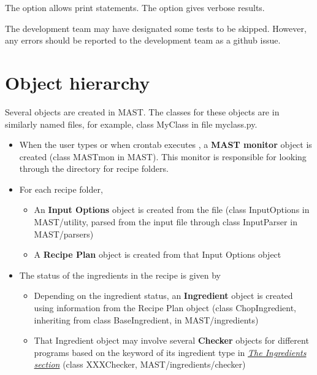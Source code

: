 \documentclass[letterpaper,10pt,english]{sphinxmanual}
\begin{document}
The  option allows print statements.
The  option gives verbose results.

The development team may have designated some tests to be skipped. However, any errors should be reported to the development team as a github issue.


\section{Object hierarchy}
\label{12_0_programming:object-hierarchy}
Several objects are created in MAST. The classes for these objects are in similarly named files, for example, class MyClass in file myclass.py.
\begin{itemize}
\item {} 
When the user types  or when crontab executes , a \textbf{MAST monitor} object is created (class MASTmon in MAST). This monitor is responsible for looking through the  directory for recipe folders.

\item {} 
For each recipe folder,
\begin{itemize}
\item {} 
An \textbf{Input Options} object is created from the  file (class InputOptions in MAST/utility, parsed from the input file through class InputParser in MAST/parsers)

\item {} 
A \textbf{Recipe Plan} object is created from that Input Options object

\end{itemize}

\item {} 
The status of the ingredients in the recipe is given by 
\begin{itemize}
\item {} 
Depending on the ingredient status, an \textbf{Ingredient} object is created using information from the Recipe Plan object (class ChopIngredient, inheriting from class BaseIngredient, in MAST/ingredients)

\item {} 
That Ingredient object may involve several \textbf{Checker} objects for different programs based on the  keyword of its ingredient type in {\hyperref[3_1_2_ingredients::doc]{\emph{The Ingredients section}}} (class XXXChecker, MAST/ingredients/checker)

\end{itemize}

\end{itemize}
\end{document}
